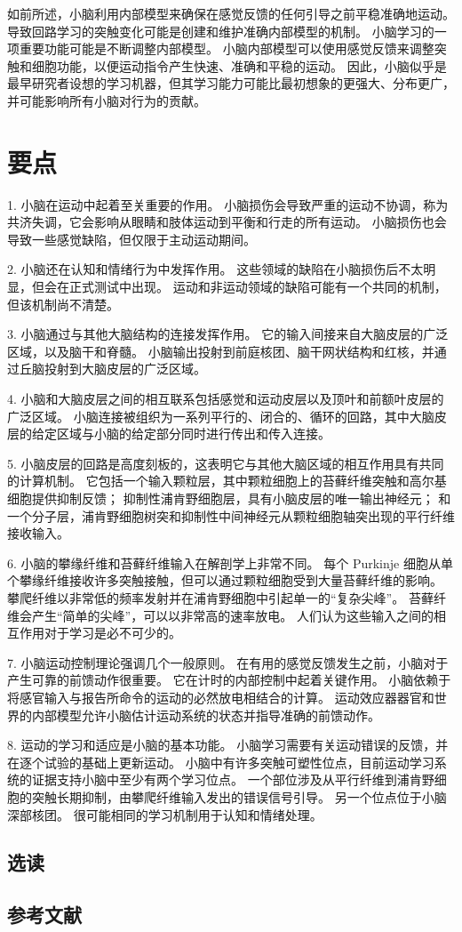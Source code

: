 如前所述，小脑利用内部模型来确保在感觉反馈的任何引导之前平稳准确地运动。 导致回路学习的突触变化可能是创建和维护准确内部模型的机制。 小脑学习的一项重要功能可能是不断调整内部模型。 小脑内部模型可以使用感觉反馈来调整突触和细胞功能，以便运动指令产生快速、准确和平稳的运动。 因此，小脑似乎是最早研究者设想的学习机器，但其学习能力可能比最初想象的更强大、分布更广，并可能影响所有小脑对行为的贡献。


\section{要点}
1. 小脑在运动中起着至关重要的作用。 小脑损伤会导致严重的运动不协调，称为共济失调，它会影响从眼睛和肢体运动到平衡和行走的所有运动。 小脑损伤也会导致一些感觉缺陷，但仅限于主动运动期间。

2. 小脑还在认知和情绪行为中发挥作用。 这些领域的缺陷在小脑损伤后不太明显，但会在正式测试中出现。 运动和非运动领域的缺陷可能有一个共同的机制，但该机制尚不清楚。

3. 小脑通过与其他大脑结构的连接发挥作用。 它的输入间接来自大脑皮层的广泛区域，以及脑干和脊髓。 小脑输出投射到前庭核团、脑干网状结构和红核，并通过丘脑投射到大脑皮层的广泛区域。

4. 小脑和大脑皮层之间的相互联系包括感觉和运动皮层以及顶叶和前额叶皮层的广泛区域。 小脑连接被组织为一系列平行的、闭合的、循环的回路，其中大脑皮层的给定区域与小脑的给定部分同时进行传出和传入连接。

5. 小脑皮层的回路是高度刻板的，这表明它与其他大脑区域的相互作用具有共同的计算机制。 它包括一个输入颗粒层，其中颗粒细胞上的苔藓纤维突触和高尔基细胞提供抑制反馈； 抑制性浦肯野细胞层，具有小脑皮层的唯一输出神经元； 和一个分子层，浦肯野细胞树突和抑制性中间神经元从颗粒细胞轴突出现的平行纤维接收输入。

6. 小脑的攀缘纤维和苔藓纤维输入在解剖学上非常不同。 每个 Purkinje 细胞从单个攀缘纤维接收许多突触接触，但可以通过颗粒细胞受到大量苔藓纤维的影响。 攀爬纤维以非常低的频率发射并在浦肯野细胞中引起单一的“复杂尖峰”。 苔藓纤维会产生“简单的尖峰”，可以以非常高的速率放电。 人们认为这些输入之间的相互作用对于学习是必不可少的。

7. 小脑运动控制理论强调几个一般原则。 在有用的感觉反馈发生之前，小脑对于产生可靠的前馈动作很重要。 它在计时的内部控制中起着关键作用。 小脑依赖于将感官输入与报告所命令的运动的必然放电相结合的计算。 运动效应器器官和世界的内部模型允许小脑估计运动系统的状态并指导准确的前馈动作。

8. 运动的学习和适应是小脑的基本功能。 小脑学习需要有关运动错误的反馈，并在逐个试验的基础上更新运动。 小脑中有许多突触可塑性位点，目前运动学习系统的证据支持小脑中至少有两个学习位点。 一个部位涉及从平行纤维到浦肯野细胞的突触长期抑制，由攀爬纤维输入发出的错误信号引导。 另一个位点位于小脑深部核团。 很可能相同的学习机制用于认知和情绪处理。

\subsection{选读}
\subsection{参考文献}

